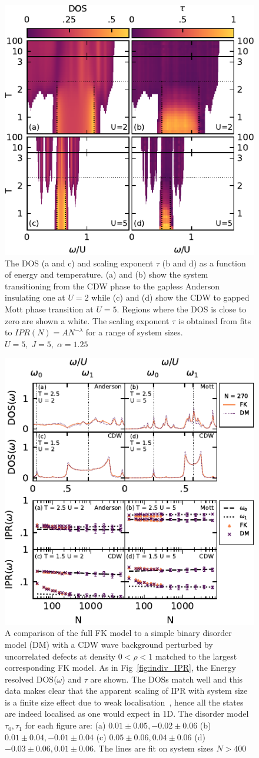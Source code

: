 \begin{figure}
  \centering
    \includegraphics[width=.5\columnwidth]{figs/FK_paper/gap_openingboth}
  \caption{  \label{fig:band_opening} The \acl{DOS} (a and c) and scaling exponent \(\tau\) (b and d) as a function of energy and temperature. (a) and (b) show the system transitioning from the CDW phase to the gapless Anderson insulating one at \(U=2\) while (c) and (d) show the CDW to gapped Mott phase transition at \(U=5\). Regions where the DOS is close to zero are shown a white. The scaling exponent \(\tau\) is obtained from fits to \(IPR(N) = A N^{-\lambda}\) for a range of system sizes.  \(U = 5,\;J = 5,\;\alpha = 1.25\)}
\end{figure}

\begin{figure}[ht]
  \centering
    \includegraphics[width=.5\columnwidth]{figs/FK_paper/indiv_IPR_disorder}
  \caption{  \label{fig:indiv_IPR_disorder} A comparison of the full \ac{FK} model to a simple binary disorder model (DM) with a CDW wave background perturbed by uncorrelated defects at density \(0 < \rho < 1\) matched to the largest corresponding FK model. As in Fig~\ref{fig:indiv_IPR}, the Energy resolved DOS(\(\omega\)) and \(\tau\) are shown. The DOSs match well and this data makes clear that the apparent scaling of IPR with system size is a finite size effect due to weak localisation~\cite{antipovInteractionTunedAndersonMott2016}, hence all the states are indeed localised as one would expect in 1D. The disorder model \(\tau_0,\tau_1\) for each figure are: (a) \(0.01\pm0.05, -0.02\pm0.06\) (b) \(0.01\pm0.04, -0.01\pm0.04\) (c) \(0.05\pm0.06, 0.04\pm0.06\) (d) \(-0.03\pm0.06, 0.01\pm0.06\). The lines are fit on system sizes \(N > 400\)
  }
\end{figure}

